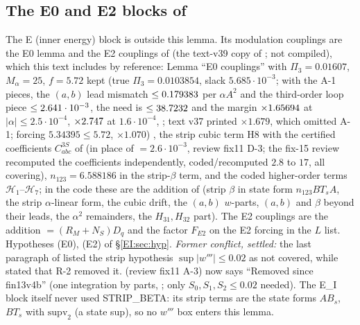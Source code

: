 \documentclass[11pt]{article}
\begin{document}
\subsection{The E0 and E2 blocks of }\label{EI:sec:E0E2}
The E (inner energy) block is outside this lemma. Its modulation couplings are the E0 lemma and the E2 couplings of  (the text-v39 copy of ; not compiled), which this text includes by reference: Lemma ``E0 couplings'' with $\Pi_3=0.01607$, $M_\alpha=25$, $f=5.72$ kept (true $\Pi_3=0.0103854$, slack $5.685\cdot10^{-3}$; with the A-1 pieces, the $(a,b)$ lead mismatch $\le0.179383$ per $\alpha A^2$ and the third-order loop piece $\le2.641\cdot10^{-3}$, the need is $\le38.7232$ and the margin $\times1.65694$ at $|\alpha|\le2.5\cdot10^{-4}$, $\times2.747$ at $1.6\cdot10^{-4}$,  ; text v37 printed $\times1.679$, which omitted A-1; forcing $5.34395\le5.72$, $\times1.070$) \tC, the strip cubic term H8 with the certified coefficients $C^{3S}_{abc}$ of  (in place of $=2.6\cdot10^{-3}$, review fix11 D-3; the fix-15 review recomputed the coefficients independently, coded/recomputed $2.8$ to $17$, all covering), $n_{123}=6.588186$ in the strip-$\beta$ term, and the coded higher-order terms $\mathcal H_1$--$\mathcal H_7$; in the code these are the addition  of  (strip $\beta$ in state form $n_{123}BT_sA$, the strip $\alpha$-linear form, the cubic drift, the $(a,b)$ $w$-parts, $(a,b)$ and $\beta$ beyond their leads, the $\alpha^2$ remainders, the $H_{31},H_{32}$ part). The E2 couplings are the addition  $=(R_M+N_S)D_q$ and the factor $F_{E2}$ on the E2 forcing in the $L$ list. Hypotheses (E0), (E2) of \S\ref{EI:sec:hyp}.
\emph{Former conflict, settled:} the last paragraph of  listed the strip hypothesis $\sup|w'''|\le0.02$ as not covered, while  stated that R-2 removed it.  (review fix11 A-3) now says ``Removed since fin13v4b'' (one integration by parts, ; only $S_0,S_1,S_2\le0.02$ needed). The E\_I block itself never used STRIP\_BETA: its strip terms are the state forms $AB_s$, $BT_s$ with $\mathrm{supv}_2$ (a state sup), so no $w'''$ box enters this lemma.
\end{document}
